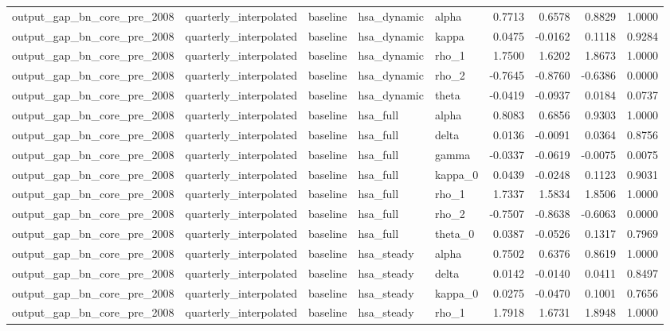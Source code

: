 \begin{tabular}{lllllrrrr}
output\_gap\_bn\_core\_pre\_2008 & quarterly\_interpolated & baseline & hsa\_dynamic & alpha & 0.7713 & 0.6578 & 0.8829 & 1.0000 \\
output\_gap\_bn\_core\_pre\_2008 & quarterly\_interpolated & baseline & hsa\_dynamic & kappa & 0.0475 & -0.0162 & 0.1118 & 0.9284 \\
output\_gap\_bn\_core\_pre\_2008 & quarterly\_interpolated & baseline & hsa\_dynamic & rho\_1 & 1.7500 & 1.6202 & 1.8673 & 1.0000 \\
output\_gap\_bn\_core\_pre\_2008 & quarterly\_interpolated & baseline & hsa\_dynamic & rho\_2 & -0.7645 & -0.8760 & -0.6386 & 0.0000 \\
output\_gap\_bn\_core\_pre\_2008 & quarterly\_interpolated & baseline & hsa\_dynamic & theta & -0.0419 & -0.0937 & 0.0184 & 0.0737 \\
output\_gap\_bn\_core\_pre\_2008 & quarterly\_interpolated & baseline & hsa\_full & alpha & 0.8083 & 0.6856 & 0.9303 & 1.0000 \\
output\_gap\_bn\_core\_pre\_2008 & quarterly\_interpolated & baseline & hsa\_full & delta & 0.0136 & -0.0091 & 0.0364 & 0.8756 \\
output\_gap\_bn\_core\_pre\_2008 & quarterly\_interpolated & baseline & hsa\_full & gamma & -0.0337 & -0.0619 & -0.0075 & 0.0075 \\
output\_gap\_bn\_core\_pre\_2008 & quarterly\_interpolated & baseline & hsa\_full & kappa\_0 & 0.0439 & -0.0248 & 0.1123 & 0.9031 \\
output\_gap\_bn\_core\_pre\_2008 & quarterly\_interpolated & baseline & hsa\_full & rho\_1 & 1.7337 & 1.5834 & 1.8506 & 1.0000 \\
output\_gap\_bn\_core\_pre\_2008 & quarterly\_interpolated & baseline & hsa\_full & rho\_2 & -0.7507 & -0.8638 & -0.6063 & 0.0000 \\
output\_gap\_bn\_core\_pre\_2008 & quarterly\_interpolated & baseline & hsa\_full & theta\_0 & 0.0387 & -0.0526 & 0.1317 & 0.7969 \\
output\_gap\_bn\_core\_pre\_2008 & quarterly\_interpolated & baseline & hsa\_steady & alpha & 0.7502 & 0.6376 & 0.8619 & 1.0000 \\
output\_gap\_bn\_core\_pre\_2008 & quarterly\_interpolated & baseline & hsa\_steady & delta & 0.0142 & -0.0140 & 0.0411 & 0.8497 \\
output\_gap\_bn\_core\_pre\_2008 & quarterly\_interpolated & baseline & hsa\_steady & kappa\_0 & 0.0275 & -0.0470 & 0.1001 & 0.7656 \\
output\_gap\_bn\_core\_pre\_2008 & quarterly\_interpolated & baseline & hsa\_steady & rho\_1 & 1.7918 & 1.6731 & 1.8948 & 1.0000 \\

\end{tabular}
